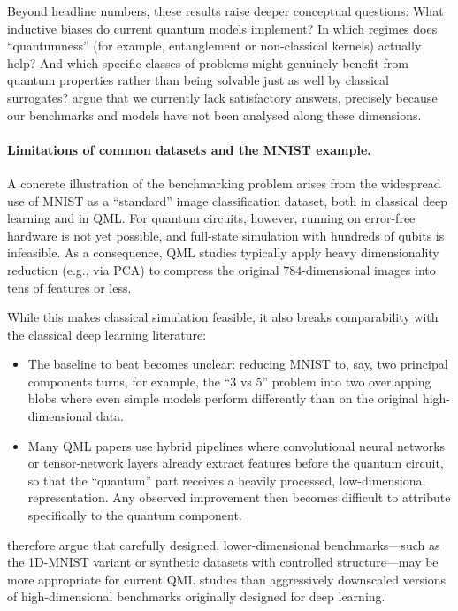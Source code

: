 Beyond headline numbers, these results raise deeper conceptual questions: What inductive biases do current quantum models implement? In which regimes does ``quantumness'' (for example, entanglement or non-classical kernels) actually help? And which specific classes of problems might genuinely benefit from quantum properties rather than being solvable just as well by classical surrogates? \textcite{bowles2024better} argue that we currently lack satisfactory answers, precisely because our benchmarks and models have not been analysed along these dimensions.

\paragraph{Limitations of common datasets and the MNIST example.}

A concrete illustration of the benchmarking problem arises from the widespread use of MNIST as a ``standard'' image classification dataset, both in classical deep learning and in QML. For quantum circuits, however, running on error-free hardware is not yet possible, and full-state simulation with hundreds of qubits is infeasible. As a consequence, QML studies typically apply heavy dimensionality reduction (e.g., via PCA) to compress the original $784$-dimensional images into tens of features or less.\cite{bowles2024better}

While this makes classical simulation feasible, it also breaks comparability with the classical deep learning literature:
\begin{itemize}
  \item The baseline to beat becomes unclear: reducing MNIST to, say, two principal components turns, for example, the ``3 vs 5'' problem into two overlapping blobs where even simple models perform differently than on the original high-dimensional data.
  \item Many QML papers use hybrid pipelines where convolutional neural networks or tensor-network layers already extract features before the quantum circuit, so that the ``quantum'' part receives a heavily processed, low-dimensional representation. Any observed improvement then becomes difficult to attribute specifically to the quantum component.
\end{itemize}
\textcite{bowles2024better} therefore argue that carefully designed, lower-dimensional benchmarks---such as the 1D-MNIST variant or synthetic datasets with controlled structure---may be more appropriate for current QML studies than aggressively downscaled versions of high-dimensional benchmarks originally designed for deep learning.

